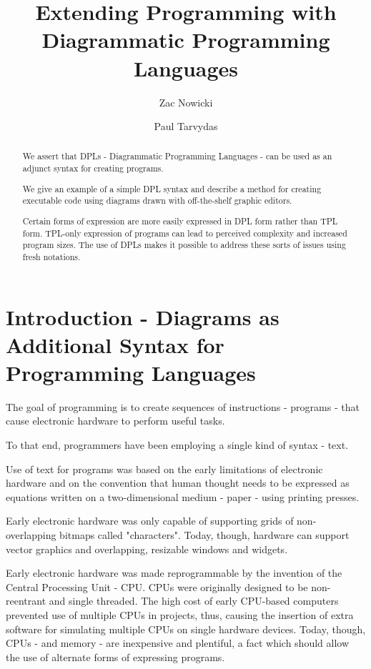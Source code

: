\documentclass[10pt]{acmart}
\title{Extending Programming with Diagrammatic Programming Languages}
\author{Zac Nowicki}
\affiliation{
  \institution{Kagi Inc.}
  \city{Palo Alto}
  \state{CA}
  \country{USA}
}
\author{Paul Tarvydas}
\affiliation{
  \institution{Retired}
  \city{Toronto}
  \state{Ontario}
  \country{Canada}
}
\begin{document}
\begin{abstract}

  We assert that DPLs - Diagrammatic Programming Languages - can be used
  as an adjunct syntax for creating programs.

  We give an example of a simple DPL syntax and describe a method for
  creating executable code using diagrams drawn with off-the-shelf graphic
  editors.
  
  Certain forms of expression are more easily expressed in DPL form rather
  than TPL form. TPL-only expression of programs can lead to perceived
  complexity and increased program sizes. The use of DPLs makes it
  possible to address these sorts of issues using fresh notations.
\end{abstract}

\maketitle

\section{Introduction - Diagrams as Additional Syntax for Programming Languages}
The goal of programming is to create sequences of instructions -
programs - that cause electronic hardware to perform useful tasks.

To that end, programmers have been employing a single kind of syntax -
text.

Use of text for programs was based on the early limitations of
electronic hardware and on the convention that human thought needs to be
expressed as equations written on a two-dimensional medium - paper -
using printing presses.

Early electronic hardware was only capable of supporting grids of
non-overlapping bitmaps called "characters". Today, though, hardware can
support vector graphics and overlapping, resizable windows and widgets.

Early electronic hardware was made reprogrammable by the invention of
the Central Processing Unit - CPU. CPUs were originally designed to be
non-reentrant and single threaded. The high cost of early CPU-based
computers prevented use of multiple CPUs in projects, thus, causing the
insertion of extra software for simulating multiple CPUs on single
hardware devices. Today, though, CPUs - and memory - are inexpensive and
plentiful, a fact which should allow the use of alternate forms of
expressing programs.
\end{document}
